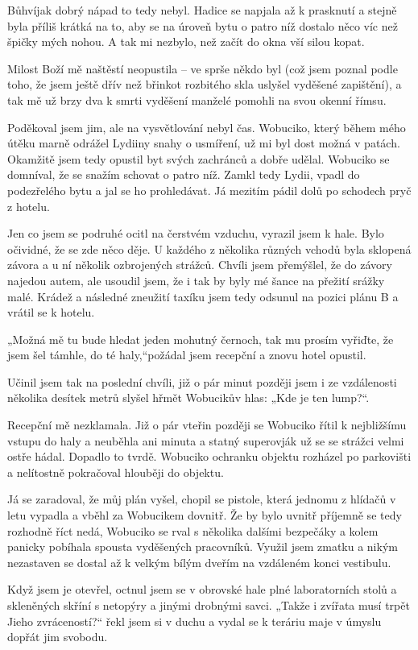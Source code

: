 Bůhvíjak dobrý nápad to tedy nebyl. Hadice se napjala až k prasknutí a stejně byla příliš krátká na to, aby se na úroveň bytu o patro níž dostalo něco víc než špičky mých nohou. A tak mi nezbylo, než začít do okna vší silou kopat.

Milost Boží mě naštěstí neopustila – ve sprše někdo byl (což jsem poznal podle toho, že jsem ještě dřív než břinkot rozbitého skla uslyšel vyděšené zapištění), a tak mě už brzy dva k smrti vyděšení manželé pomohli na svou okenní římsu.

Poděkoval jsem jim, ale na vysvětlování nebyl čas. Wobuciko, který během mého útěku marně odrážel Lydiiny snahy o usmíření, už mi byl dost možná v patách. Okamžitě jsem tedy opustil byt svých zachránců a dobře udělal. Wobuciko se domníval, že se snažím schovat o patro níž. Zamkl tedy Lydii, vpadl do podezřelého bytu a jal se ho prohledávat. Já mezitím pádil dolů po schodech pryč z hotelu.

Jen co jsem se podruhé ocitl na čerstvém vzduchu, vyrazil jsem k hale. Bylo očividné, že se zde něco děje. U každého z několika různých vchodů byla sklopená závora a u ní několik ozbrojených strážců. Chvíli jsem přemýšlel, že do závory najedou autem, ale usoudil jsem, že i tak by byly mé šance na přežití srážky malé. Krádež a následné zneužití taxíku jsem tedy odsunul na pozici plánu B a vrátil se k hotelu.

„Možná mě tu bude hledat jeden mohutný černoch, tak mu prosím vyřiďte, že jsem šel támhle, do té haly,“požádal jsem recepční a znovu hotel opustil.

Učinil jsem tak na poslední chvíli, již o pár minut později jsem i ze vzdálenosti několika desítek metrů slyšel hřmět Wobucikův hlas: „Kde je ten lump?“. 

Recepční mě nezklamala. Již o pár vteřin později se Wobuciko řítil k nejbližšímu vstupu do haly a neuběhla ani minuta a statný superovják už se se strážci velmi ostře hádal. Dopadlo to tvrdě. Wobuciko ochranku objektu rozházel po parkovišti a nelítostně pokračoval hlouběji do objektu.

Já se zaradoval, že můj plán vyšel, chopil se pistole, která jednomu z hlídačů v letu vypadla a vběhl za Wobucikem dovnitř. Že by bylo uvnitř příjemně se tedy rozhodně říct nedá, Wobuciko se rval s několika dalšími bezpečáky a kolem panicky pobíhala spousta vyděšených pracovníků. Využil jsem zmatku a nikým nezastaven se dostal až k velkým bílým dveřím na vzdáleném konci vestibulu.

Když jsem je otevřel, octnul jsem se v obrovské hale plné laboratorních stolů a skleněných skříní s netopýry a jinými drobnými savci. „Takže i zvířata musí trpět Jieho zvráceností?“ řekl jsem si v duchu a vydal se k teráriu maje v úmyslu dopřát jim svobodu.

